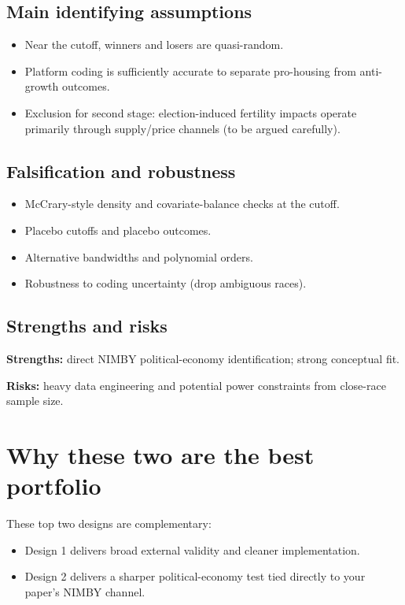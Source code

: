 \documentclass[11pt]{article}
\begin{document}
\subsection*{Main identifying assumptions}
\begin{itemize}
\item Near the cutoff, winners and losers are quasi-random.
\item Platform coding is sufficiently accurate to separate pro-housing from anti-growth outcomes.
\item Exclusion for second stage: election-induced fertility impacts operate primarily through supply/price channels (to be argued carefully).
\end{itemize}

\subsection*{Falsification and robustness}
\begin{itemize}
\item McCrary-style density and covariate-balance checks at the cutoff.
\item Placebo cutoffs and placebo outcomes.
\item Alternative bandwidths and polynomial orders.
\item Robustness to coding uncertainty (drop ambiguous races).
\end{itemize}

\subsection*{Strengths and risks}
\textbf{Strengths:} direct NIMBY political-economy identification; strong conceptual fit.

\textbf{Risks:} heavy data engineering and potential power constraints from close-race sample size.

\section{Why these two are the best portfolio}
These top two designs are complementary:
\begin{itemize}
\item Design 1 delivers broad external validity and cleaner implementation.
\item Design 2 delivers a sharper political-economy test tied directly to your paper's NIMBY channel.
\end{itemize}
\end{document}
